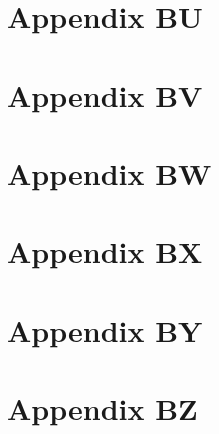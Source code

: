 \chapter{Appendix BU}

\chapter{Appendix BV}

\chapter{Appendix BW}

\chapter{Appendix BX}

\chapter{Appendix BY}

\chapter{Appendix BZ}
